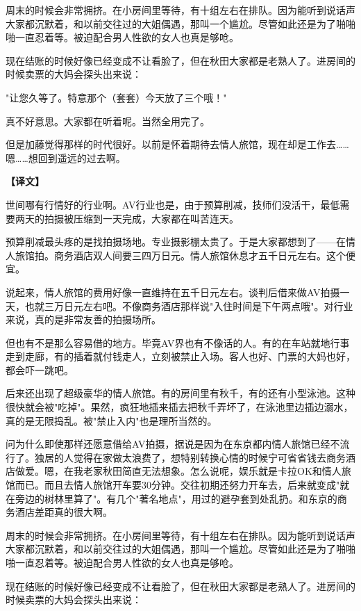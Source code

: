 \documentclass[12pt,UTF8]{ctexbook}
\begin{document}
{{周末的时候会非常拥挤。在小房间里等待，有十组左右在排队。因为能听到说话声大家都沉默着，和以前交往过的大姐偶遇，那叫一个尴尬。尽管如此还是为了啪啪啪一直忍着等。被迫配合男人性欲的女人也真是够呛。

现在结账的时候好像已经变成不让看脸了，但在秋田大家都是老熟人了。进房间的时候卖票的大妈会探头出来说：

"让您久等了。特意那个（套套）今天放了三个哦！"

真不好意思。大家都在听着呢。当然全用完了。

但是加藤觉得那样的时代很好。以前是怀着期待去情人旅馆，现在却是工作去……嗯……想回到遥远的过去啊。
}

\vspace{2ex}
\parbox{0.9\linewidth}{
\textbf{【译文】}\par

世间哪有行情好的行业啊。AV行业也是，由于预算削减，技师们没活干，最低需要两天的拍摄被压缩到一天完成，大家都在叫苦连天。

预算削减最头疼的是找拍摄场地。专业摄影棚太贵了。于是大家都想到了——在情人旅馆拍。商务酒店双人间要三四万日元。情人旅馆休息才五千日元左右。这个便宜。

说起来，情人旅馆的费用好像一直维持在五千日元左右。谈判后借来做AV拍摄一天，也就三万日元左右吧。不像商务酒店那样说"入住时间是下午两点哦"。对行业来说，真的是非常友善的拍摄场所。

但也有不是那么容易借的地方。毕竟AV界也有不像话的人。有的在车站就地行事走到走廊，有的插着就付钱走人，立刻被禁止入场。客人也好、门票的大妈也好，都会吓一跳吧。

后来还出现了超级豪华的情人旅馆。有的房间里有秋千，有的还有小型泳池。这种很快就会被"吃掉"。果然，疯狂地插来插去把秋千弄坏了，在泳池里边插边溺水，真的是无限捣乱。被"禁止入内"也是理所当然的。

问为什么即使那样还愿意借给AV拍摄，据说是因为在东京都内情人旅馆已经不流行了。独居的人觉得在家做太浪费了，想特别转换心情的时候宁可省省钱去商务酒店做爱。嗯，在我老家秋田简直无法想象。怎么说呢，娱乐就是卡拉OK和情人旅馆而已。而且去情人旅馆开车要30分钟。交往初期还努力开车去，后来就变成"就在旁边的树林里算了"。有几个"著名地点"，用过的避孕套到处乱扔。和东京的商务酒店差距真的很大啊。

周末的时候会非常拥挤。在小房间里等待，有十组左右在排队。因为能听到说话声大家都沉默着，和以前交往过的大姐偶遇，那叫一个尴尬。尽管如此还是为了啪啪啪一直忍着等。被迫配合男人性欲的女人也真是够呛。

现在结账的时候好像已经变成不让看脸了，但在秋田大家都是老熟人了。进房间的时候卖票的大妈会探头出来说：

}}
\end{document}
